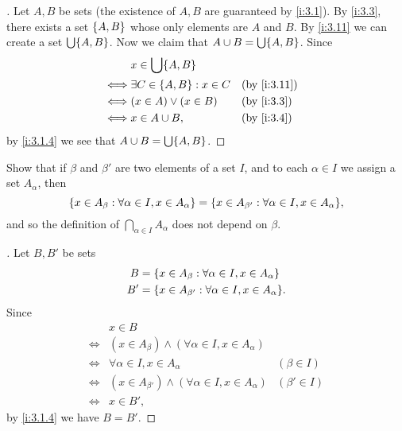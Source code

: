 \begin{proof}[]
  Let \(A, B\) be sets (the existence of \(A, B\) are guaranteed by \cref{i:3.1}).
  By \cref{i:3.3}, there exists a set \(\left\lbrace A, B\right\rbrace\) whose only elements are \(A\) and \(B\).
  By \cref{i:3.11} we can create a set \(\bigcup \set{A, B}\).
  Now we claim that \(A \cup B = \bigcup \set{A, B}\).
  Since
  \begin{align*}
         & x \in \bigcup \set{A, B}                            \\
    \iff & \exists C \in \set{A, B} : x \in C &  & \by{i:3.11} \\
    \iff & (x \in A) \lor (x \in B)           &  & \by{i:3.3}  \\
    \iff & x \in A \cup B,                    &  & \by{i:3.4}
  \end{align*}
  by \cref{i:3.1.4} we see that \(A \cup B = \bigcup \set{A, B}\).
\end{proof}

\begin{ex}\label{i:ex:3.4.9}
  Show that if \(\beta\) and \(\beta'\) are two elements of a set \(I\), and to each \(\alpha \in I\) we assign a set \(A_\alpha\), then
  \[
    \set{x \in A_\beta : \forall \alpha \in I, x \in A_\alpha} = \set{x \in A_{\beta'} : \forall \alpha \in I, x \in A_\alpha},
  \]
  and so the definition of \(\bigcap_{\alpha \in I} A_\alpha\) does not depend on \(\beta\).
\end{ex}

\begin{proof}[]
  Let \(B, B'\) be sets
  \begin{align*}
    B  & = \set{x \in A_\beta : \forall \alpha \in I, x \in A_\alpha}     \\
    B' & = \set{x \in A_{\beta'} : \forall \alpha \in I, x \in A_\alpha}.
  \end{align*}
  Since
  \begin{align*}
         & x \in B                                                                          \\
    \iff & (x \in A_\beta) \land (\forall \alpha \in I, x \in A_\alpha)                     \\
    \iff & \forall \alpha \in I, x \in A_\alpha                            & (\beta \in I)  \\
    \iff & (x \in A_{\beta'}) \land (\forall \alpha \in I, x \in A_\alpha) & (\beta' \in I) \\
    \iff & x \in B',
  \end{align*}
  by \cref{i:3.1.4} we have \(B = B'\).
\end{proof}


